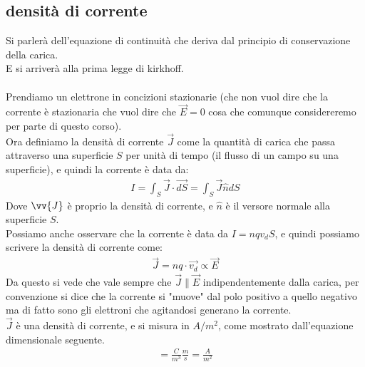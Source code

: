\documentclass[a4paper, oneside]{article}
\begin{document}
\subsection{densità di corrente}
Si parlerà dell'equazione di continuità che deriva dal principio di conservazione della carica.\\
E si arriverà alla prima legge di kirkhoff.\\
\hfil\\
Prendiamo un elettrone in concizioni stazionarie (che non vuol dire che la corrente è stazionaria che vuol dire che $\vec{E} = 0$ cosa che comunque considereremo per parte di questo corso).\\
Ora definiamo la densità di corrente $\vec{J}$ come la quantità di carica che passa attraverso una superficie $S$ per unità di tempo (il flusso di un campo su una superficie), e quindi la corrente è data da:
\begin{gather*}
    I = \int_S \vec{J} \cdot \vec{dS} = \int_S \vec{J} \widehat{n} dS
\end{gather*}
Dove $\vv{J}$ è proprio la densità di corrente, e $\widehat{n}$ è il versore normale alla superficie $S$.\\
Possiamo anche osservare che la corrente è data da $I = n q v_d S$, e quindi possiamo scrivere la densità di corrente come:
\begin{gather*}
    \vec{J} = n q \cdot \vec{v_d} \propto \vec{E}
\end{gather*}
Da questo si vede che vale sempre che $\vec{J} \parallel \vec{E}$ indipendentemente dalla carica, per convenzione si dice che la corrente si "muove" dal polo positivo 
a quello negativo ma di fatto sono gli elettroni che agitandosi generano la corrente.\\
$\vec{J}$ è una densità di corrente, e si misura in $A/m^2$, come mostrato dall'equazione dimensionale seguente.\\
\begin{gather*}
    [J] = \frac{C}{m^3} \frac{m}{s} = \frac{A}{m^2} 
\end{gather*}
\end{document}
